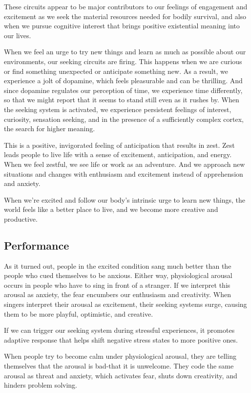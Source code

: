 \documentclass[ebook,12pt,oneside,openany]{memoir}
\begin{document}
These circuits appear to be major contributors to our feelings of engagement and excitement 
as we seek the material resources needed for bodily survival, and also when we pursue
cognitive interest that brings positive existential meaning into our lives.

When we feel an urge to try new things and learn as much as possible about our environments, 
our seeking circuits are firing.
This happens when we are curious or find something unexpected or anticipate something new.
As a result, we experience a jolt of dopamine, which feels pleasurable and can be thrilling.
And since dopamine regulates our perception of time, we experience time differently, so that 
we might report that it seems to stand still even as it rushes by.
When the seeking system is activated, we experience persistent feelings of interest,
curiosity, sensation seeking, and in the presence of a sufficiently complex cortex, the search for higher meaning.

This is a positive, invigorated feeling of anticipation that results in zest. 
Zest leads people to live life with a sense of excitement, anticipation, and energy.
When we feel zestful, we see life or work as an adventure. 
And we approach new situations and changes with enthusiasm and excitement instead of apprehension and anxiety.

When we're excited and follow our body's intrinsic urge to learn new things,
the world feels like a better place to live, and we become more creative and productive.

\subsection{Performance}
As it turned out, people in the excited condition sang much better than the people 
who cued themselves to be anxious. 
Either way, physiological arousal occurs in people who have to sing in front of a stranger.
If we interpret this arousal as anxiety, the fear encumbers our enthusiasm and creativity.
When singers interpret their arousal as excitement, their seeking systems surge, causing them 
to be more playful, optimistic, and creative.

If we can trigger our seeking system during stressful experiences, it promotes 
adaptive response that helps shift negative stress states to more positive ones.

When people try to become calm under physiological arousal, they are telling themselves that the arousal is bad-that it is unwelcome.
They code the same arousal as threat and anxiety, which activates fear, shuts down creativity, and hinders problem solving.
\end{document}
